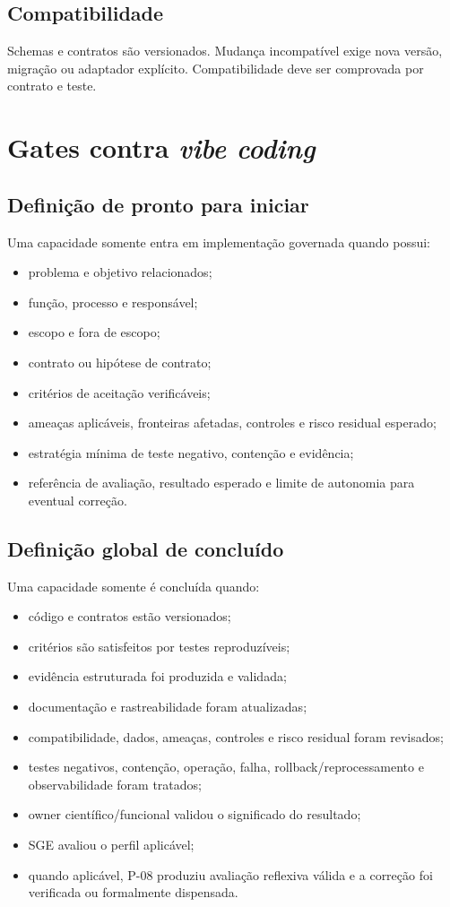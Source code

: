 \documentclass[11pt,a4paper,oneside]{article}
\begin{document}
\subsection{Compatibilidade}
Schemas e contratos são versionados. Mudança incompatível exige nova versão, migração ou adaptador explícito. Compatibilidade deve ser comprovada por contrato e teste.

\section{Gates contra \textit{vibe coding}}

\subsection{Definição de pronto para iniciar}
Uma capacidade somente entra em implementação governada quando possui:
\begin{itemize}
  \item problema e objetivo relacionados;
  \item função, processo e responsável;
  \item escopo e fora de escopo;
  \item contrato ou hipótese de contrato;
  \item critérios de aceitação verificáveis;
  \item ameaças aplicáveis, fronteiras afetadas, controles e risco residual esperado;
  \item estratégia mínima de teste negativo, contenção e evidência;
  \item referência de avaliação, resultado esperado e limite de autonomia para eventual correção.
\end{itemize}

\subsection{Definição global de concluído}
Uma capacidade somente é concluída quando:
\begin{itemize}
  \item código e contratos estão versionados;
  \item critérios são satisfeitos por testes reproduzíveis;
  \item evidência estruturada foi produzida e validada;
  \item documentação e rastreabilidade foram atualizadas;
  \item compatibilidade, dados, ameaças, controles e risco residual foram revisados;
  \item testes negativos, contenção, operação, falha, rollback/reprocessamento e observabilidade foram tratados;
  \item owner científico/funcional validou o significado do resultado;
  \item SGE avaliou o perfil aplicável;
  \item quando aplicável, P-08 produziu avaliação reflexiva válida e a correção foi verificada ou formalmente dispensada.
\end{itemize}
\end{document}
